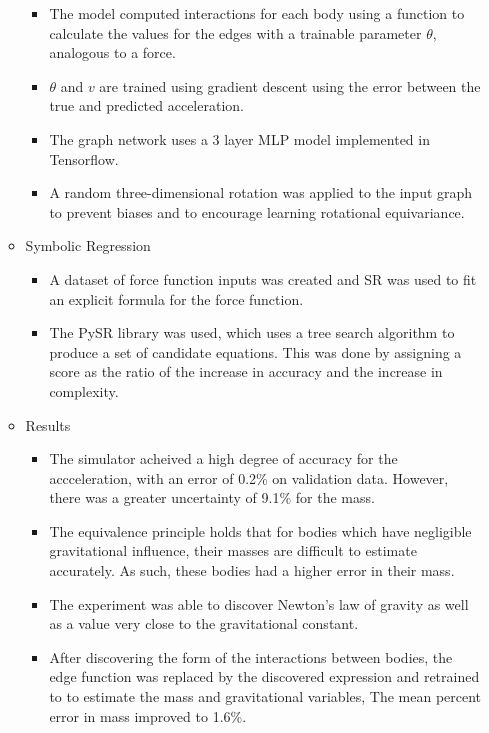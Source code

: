 \documentclass[fleqn,10pt]{olplainarticle}
\begin{document}
\begin{itemize}
\begin{itemize}
\begin{itemize}
                        \item The model computed interactions for each body using a function to calculate the values for the edges with a trainable parameter $\theta$, analogous to a force.
                        \item $\theta$ and $v$ are trained using gradient descent using the error between the true and predicted acceleration.
                        \item The graph network uses a 3 layer MLP model implemented in Tensorflow.
                        \item A random three-dimensional rotation was applied to the input graph to prevent biases and to encourage learning rotational equivariance.
                    \end{itemize}
              \item Symbolic Regression
                    \begin{itemize}
                        \item A dataset of force function inputs was created and SR was used to fit an explicit formula for the force function.
                        \item The PySR library was used, which uses a tree search algorithm to produce a set of candidate equations. This was done by assigning a score as the ratio of the increase in accuracy and the increase in complexity.
                    \end{itemize}
              \item Results
                    \begin{itemize}
                        \item The simulator acheived a high degree of accuracy for the accceleration, with an error of 0.2\% on validation data. However, there was a greater uncertainty of 9.1\% for the mass.
                        \item The equivalence principle holds that for bodies which have negligible gravitational influence, their masses are difficult to estimate accurately. As such, these bodies had a higher error in their mass.
                        \item The experiment was able to discover Newton's law of gravity as well as a value very close to the gravitational constant.
                        \item After discovering the form of the interactions between bodies, the edge function was replaced by the discovered expression and retrained to to estimate the mass and gravitational variables, The mean percent error in mass improved to 1.6\%.

\end{itemize}
\end{itemize}
\end{itemize}
\end{document}
